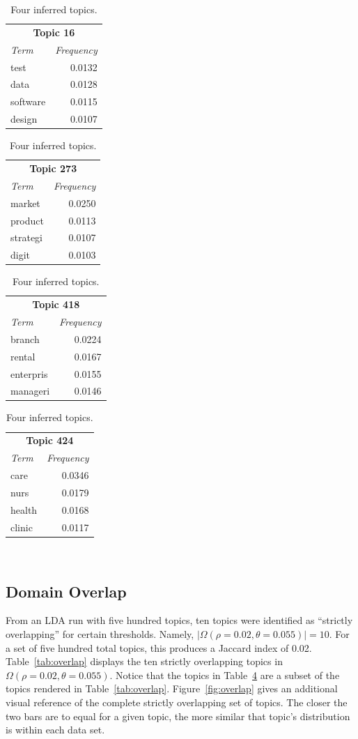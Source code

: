 \begin{table}
  \centering
  \begin{tabular}{l r}
    \multicolumn{2}{c}{\small{\textbf{Topic 16}}} \\
    {\small\textit{Term}} & {\small\textit{Frequency}} \\
    \hline
    test & 0.0132 \\
    data & 0.0128 \\
    software & 0.0115 \\
    design & 0.0107
  \end{tabular}
  \begin{tabular}{l r}
    \multicolumn{2}{c}{\small{\textbf{Topic 273}}} \\
    {\small\textit{Term}} & {\small\textit{Frequency}} \\
    \hline
    market & 0.0250 \\
    product & 0.0113 \\
    strategi & 0.0107 \\
    digit & 0.0103
  \end{tabular}
  \begin{tabular}{l r}
    \multicolumn{2}{c}{\small{\textbf{Topic 418}}} \\
    {\small\textit{Term}} & {\small\textit{Frequency}} \\
    \hline
    branch & 0.0224 \\
    rental & 0.0167 \\
    enterpris & 0.0155 \\
    manageri & 0.0146
  \end{tabular}
  \begin{tabular}{l r}
    \multicolumn{2}{c}{\small{\textbf{Topic 424}}} \\
    {\small\textit{Term}} & {\small\textit{Frequency}} \\
    \hline
    care & 0.0346 \\
    nurs & 0.0179 \\
    health & 0.0168 \\
    clinic & 0.0117
  \end{tabular}
  \caption{Four inferred topics.}~\label{tab:topics}
\end{table}

\subsection{Domain Overlap}

From an LDA run with five hundred topics, ten topics were identified as ``strictly overlapping'' for certain thresholds.
Namely, $|\Omega(\rho=0.02, \theta=0.055)| = 10$.
For a set of five hundred total topics, this produces a Jaccard index of 0.02.
Table~\ref{tab:overlap} displays the ten strictly overlapping topics in $\Omega(\rho=0.02, \theta=0.055)$.
Notice that the topics in Table~\ref{tab:topics} are a subset of the topics rendered in Table~\ref{tab:overlap}.
Figure~\ref{fig:overlap} gives an additional visual reference of the complete strictly overlapping set of topics.
The closer the two bars are to equal for a given topic, the more similar that topic's distribution is within each data set.


